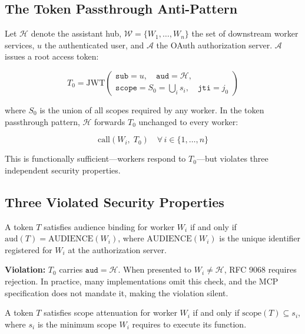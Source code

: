 \documentclass[journal]{IEEEtran}
\begin{document}
\subsection{The Token Passthrough Anti-Pattern}

Let $\mathcal{H}$ denote the assistant hub, $\mathcal{W} = \{W_1,\ldots,W_n\}$ the
set of downstream worker services, $u$ the authenticated user, and $\mathcal{A}$
the OAuth authorization server. $\mathcal{A}$ issues a root access token:

\begin{equation}
T_0 = \mathrm{JWT}\!\left(\begin{array}{l}
  \texttt{sub} = u,\quad
  \texttt{aud} = \mathcal{H},\\[2pt]
  \texttt{scope} = S_0 = \bigcup_{i} s_i,\quad
  \texttt{jti} = j_0
\end{array}\right)
\label{eq:root}
\end{equation}

where $S_0$ is the union of all scopes required by any worker. In the token
passthrough pattern, $\mathcal{H}$ forwards $T_0$ unchanged to every worker:

\begin{equation}
\mathrm{call}(W_i,\; T_0) \quad \forall\, i \in \{1, \ldots, n\}
\label{eq:passthrough}
\end{equation}

This is functionally sufficient---workers respond to $T_0$---but violates three
independent security properties.

\subsection{Three Violated Security Properties}

\begin{definition}
A token $T$ satisfies audience binding for worker $W_i$ if and only if
$\mathrm{aud}(T) = \mathrm{AUDIENCE}(W_i)$, where $\mathrm{AUDIENCE}(W_i)$ is
the unique identifier registered for $W_i$ at the authorization server.
\end{definition}

\textbf{Violation:} $T_0$ carries $\texttt{aud} = \mathcal{H}$. When presented
to $W_i \neq \mathcal{H}$, RFC 9068 requires rejection. In practice, many
implementations omit this check, and the MCP specification does not mandate it,
making the violation silent.

\begin{definition}
A token $T$ satisfies scope attenuation for worker $W_i$ if and only if
$\mathrm{scope}(T) \subseteq s_i$, where $s_i$ is the minimum scope $W_i$
requires to execute its function.
\end{definition}
\end{document}
